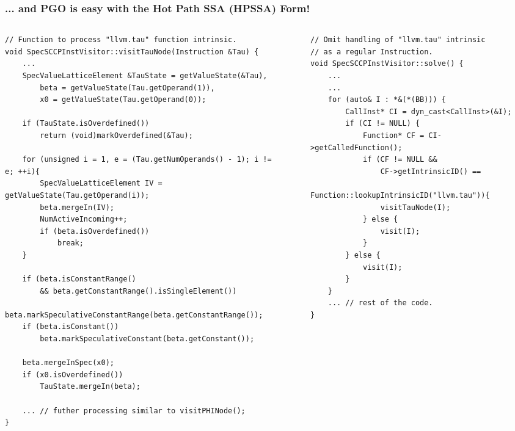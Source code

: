 \documentclass[aspectratio=169, compress]{beamer}
\begin{document}
\begin{frame}[fragile]
	\frametitle{... and PGO is easy with the Hot Path SSA (HPSSA) Form!}
	\begin{columns}
		\begin{column}{0.5\textwidth}
	\begin{verbatim}
// Function to process "llvm.tau" function intrinsic.
void SpecSCCPInstVisitor::visitTauNode(Instruction &Tau) {
	...
	SpecValueLatticeElement &TauState = getValueState(&Tau), 
		beta = getValueState(Tau.getOperand(1)), 
		x0 = getValueState(Tau.getOperand(0));
		
	if (TauState.isOverdefined())
		return (void)markOverdefined(&Tau);
		
	for (unsigned i = 1, e = (Tau.getNumOperands() - 1); i != e; ++i){
		SpecValueLatticeElement IV = getValueState(Tau.getOperand(i));
		beta.mergeIn(IV);
		NumActiveIncoming++;
		if (beta.isOverdefined())
			break;
	}
	 
	if (beta.isConstantRange() 
		&& beta.getConstantRange().isSingleElement())
		beta.markSpeculativeConstantRange(beta.getConstantRange());
	if (beta.isConstant())
		beta.markSpeculativeConstant(beta.getConstant());
		
	beta.mergeInSpec(x0);
	if (x0.isOverdefined())
		TauState.mergeIn(beta);
		
	... // futher processing similar to visitPHINode();
}
\end{verbatim}
		\end{column}
	\begin{column}{0.01\textwidth} \end{column}
		\begin{column}{0.4\textwidth}  
			\begin{verbatim}
// Omit handling of "llvm.tau" intrinsic 
// as a regular Instruction.
void SpecSCCPInstVisitor::solve() {
	...
	...
	for (auto& I : *&(*(BB))) {
		CallInst* CI = dyn_cast<CallInst>(&I);
		if (CI != NULL) {
			Function* CF = CI->getCalledFunction();
			if (CF != NULL &&
				CF->getIntrinsicID() == 
			  Function::lookupIntrinsicID("llvm.tau")){
				visitTauNode(I);
			} else {
				visit(I);
			} 
		} else {
			visit(I);
		}
	}
	... // rest of the code.
}


\end{verbatim}
\end{column}
\end{columns}
\end{frame}
\end{document}
